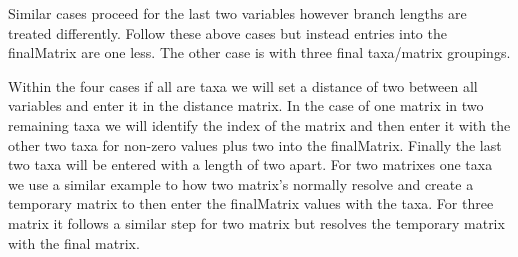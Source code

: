 \documentclass{article}
\begin{document}
Similar cases proceed for the last two variables however branch lengths are treated differently. Follow these above cases but instead entries into the finalMatrix are one less. The other case is with three final taxa/matrix groupings. 

Within the four cases if all are taxa we will set a distance of two between all variables and enter it in the distance matrix. In the case of one matrix in two remaining taxa we will identify the index of the matrix and then enter it with the other two taxa for non-zero values plus two into the finalMatrix. Finally the last two taxa will be entered with a length of two apart. For two matrixes one taxa we use a similar example to how two matrix’s normally resolve and create a temporary matrix to then enter the finalMatrix values with the taxa. For three matrix it follows a similar step for two matrix but resolves the temporary matrix with the final matrix. 
\end{document}
